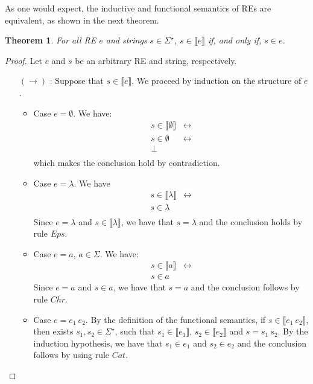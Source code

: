 \documentclass[oneside,12pt]{scrbook}
\newtheorem{Theorem}{Theorem}
\theoremstyle{definition}
\newcommand{\sembrackets}[1]{\ensuremath{\llbracket #1 \rrbracket}}
\theoremstyle{plain}
\theoremstyle{definition}
\begin{document}
As one would expect, the inductive and functional semantics of REs are equivalent, as shown in the next theorem.

\begin{Theorem}
  For all RE $e$ and strings $s \in \Sigma^\star$, $s \in \sembrackets{e}$ if, and only if, $s \in e$.
\end{Theorem}
\begin{proof}
  Let $e$ and $s$ be an arbitrary RE and string, respectively.
  \begin{itemize}
    \item[$(\to)$]: Suppose that $s \in\sembrackets{e}$. We proceed by induction on the structure of $e$.
    \begin{itemize}
      \item Case $e = \emptyset$. We have:
      \begin{align*}
          s \in \sembrackets{\emptyset}  & \leftrightarrow \\
          s \in \emptyset                & \leftrightarrow \\
          \bot \\
      \end{align*}
      which makes the conclusion hold by contradiction.
      \item Case $e = \lambda$. We have
      \begin{align*}
        s \in\sembrackets{\lambda} & \leftrightarrow \\
        s \in \lambda \\
      \end{align*}
      Since $e = \lambda$ and $s \in \sembrackets{\lambda}$, we have that $s = \lambda$ and
      the conclusion holds by rule $Eps$.
      \item Case $e = a$, $a \in \Sigma$. We have:
      \begin{align*}
        s \in\sembrackets{a} & \leftrightarrow \\
        s \in a
      \end{align*}
      Since $e = a$ and $s \in a$, we have that $s = a$ and the conclusion follows by rule $Chr$.
      \item Case $e = e_1\:e_2$. By the definition of the functional semantics, if $s \in \sembrackets{e_1\:e_2}$,
            then exists $s_1,s_2 \in \Sigma^\star$, such that $s_1 \in\sembrackets{e_1}$, $s_2 \in\sembrackets{e_2}$ and
            $s = s_1\:s_2$. By the induction hypothesis, we have that $s_1 \in e_1$ and $s_2 \in e_2$ and the conclusion
            follows by using rule $Cat$.

\end{itemize}
\end{itemize}
\end{proof}
\end{document}
